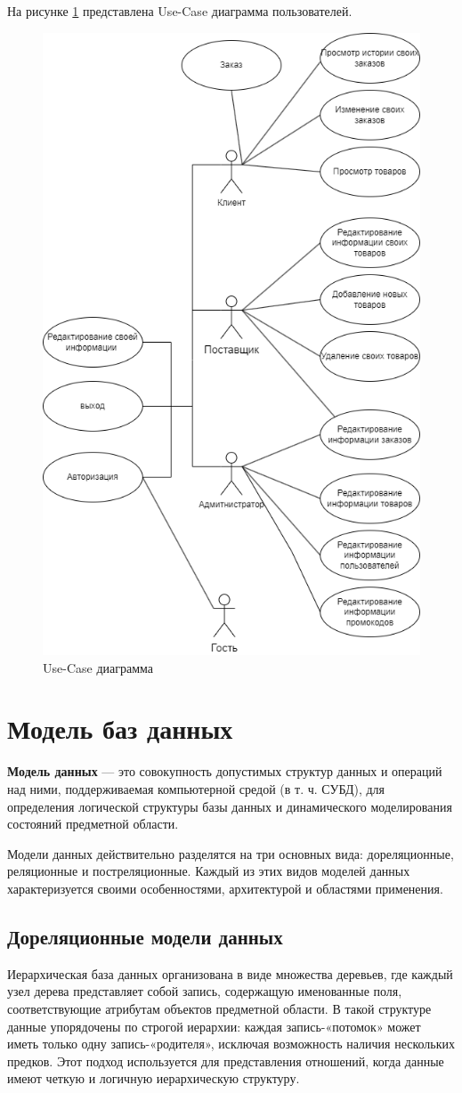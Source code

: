 На рисунке \ref{img:user-case} представлена Use-Case диаграмма пользователей.
\begin{figure}[ht!]
	\centering
	\includegraphics[width=0.5\linewidth]{img/user_case.png}
	\caption{Use-Case диаграмма}
	\label{img:user-case}
\end{figure}

\newpage
\section{Модель баз данных}
\textbf{Модель данных} --- это совокупность допустимых структур данных и операций над ними, поддерживаемая компьютерной средой (в т. ч. СУБД), для определения логической структуры базы 
данных и динамического моделирования состояний предметной области. \cite{bd-1}

Модели данных действительно  разделятся на три основных вида: дореляционные, реляционные и постреляционные. Каждый из этих видов моделей данных характеризуется своими особенностями, архитектурой и областями применения.

\subsection{Дореляционные модели данных}
Иерархическая база данных организована в виде множества деревьев, где каждый узел дерева представляет собой запись, содержащую именованные поля, соответствующие атрибутам объектов предметной области. В такой структуре данные упорядочены по строгой иерархии: каждая запись-«потомок» может иметь только одну запись-«родителя», исключая возможность наличия нескольких предков. Этот подход используется для представления отношений, когда данные имеют четкую и логичную иерархическую структуру. \cite{csharp}

